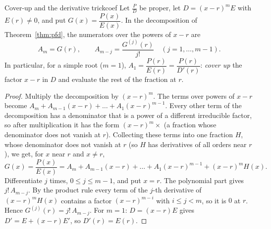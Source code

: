 \documentclass[11pt]{article}
\begin{document}
\begin{thm}{Cover-up and the derivative trick}{coef}
Let $\frac PD$ be proper, let $D=(x-r)^m E$ with $E(r)\ne0$, and put $G(x)=\dfrac{P(x)}{E(x)}$. In the decomposition of Theorem~\ref{thm:pfd}, the numerators over the powers of $x-r$ are
\[A_m=G(r),\qquad A_{m-j}=\frac{G^{(j)}(r)}{j!}\quad(j=1,\dots,m-1).\]
In particular, for a simple root ($m=1$), $A_1=\dfrac{P(r)}{E(r)}=\dfrac{P(r)}{D'(r)}$: \emph{cover up} the factor $x-r$ in $D$ and evaluate the rest of the fraction at $r$.
\end{thm}
\begin{proof}
Multiply the decomposition by $(x-r)^m$. The terms over powers of $x-r$ become $A_m+A_{m-1}(x-r)+\dots+A_1(x-r)^{m-1}$. Every other term of the decomposition has a denominator that is a power of a different irreducible factor, so after multiplication it has the form $(x-r)^m\times$ (a fraction whose denominator does not vanish at $r$). Collecting these terms into one fraction $H$, whose denominator does not vanish at $r$ (so $H$ has derivatives of all orders near $r$), we get, for $x$ near $r$ and $x\ne r$,
\[G(x)=\frac{P(x)}{E(x)}=A_m+A_{m-1}(x-r)+\dots+A_1(x-r)^{m-1}+(x-r)^mH(x).\]
Differentiate $j$ times, $0\le j\le m-1$, and put $x=r$. The polynomial part gives $j!\,A_{m-j}$. By the product rule every term of the $j$-th derivative of $(x-r)^mH(x)$ contains a factor $(x-r)^{m-i}$ with $i\le j<m$, so it is $0$ at $r$. Hence $G^{(j)}(r)=j!\,A_{m-j}$. For $m=1$: $D=(x-r)E$ gives $D'=E+(x-r)E'$, so $D'(r)=E(r)$.
\end{proof}
\end{document}
